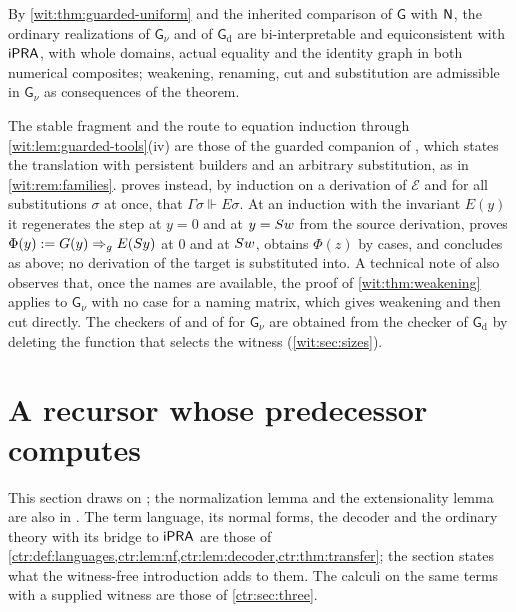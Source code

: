 By \cref{wit:thm:guarded-uniform} and the inherited comparison of
$\mathsf{G}$ with $\mathsf{N}$, the ordinary realizations of $\mathsf{G}_{\nu}$
and of $\mathsf{G}_{\mathrm d}$ are bi-interpretable and equiconsistent with
$\mathsf{iPRA}$, with whole domains, actual equality and the identity graph in both
numerical composites; weakening, renaming, cut and substitution are
admissible in $\mathsf{G}_{\nu}$ as consequences of the theorem.

\begin{remark}[Versions]
\label{wit:rem:guarded-versions}
The stable fragment and the route to equation induction through
\cref{wit:lem:guarded-tools}(iv) are those of the guarded companion of
, which states the translation with persistent
builders and an arbitrary substitution, as in \cref{wit:rem:families}.
 proves instead, by induction on a derivation of
$\mathcal E$ and for all substitutions $\sigma$ at once, that
$\Gamma\sigma\Vdash E\sigma$.  At an induction with the invariant $E(y)$ it
regenerates the step at $y=0$ and at $y=S w$ from the source
derivation, proves $\Phi(y)\mathrel{:=} G(y)\Rightarrow_{g}E(S y)$ at $0$ and
at $S w$, obtains $\Phi(z)$ by cases, and concludes as above; no
derivation of the target is substituted into.  A technical note of
 also observes that, once the names are available, the
proof of \cref{wit:thm:weakening} applies to $\mathsf{G}_{\nu}$ with no
case for a naming matrix, which gives weakening and then cut directly.
The checkers of  and of  for
$\mathsf{G}_{\nu}$ are obtained from the checker of
$\mathsf{G}_{\mathrm d}$ by deleting the function that selects the witness
(\cref{wit:sec:sizes}).
\end{remark}

\section{A recursor whose predecessor computes}
\label{wit:sec:recursor}

This section draws on ; the normalization lemma and the
extensionality lemma are also in .  The term
language, its normal forms, the decoder and the ordinary theory with its
bridge to $\mathsf{iPRA}$ are those of \cref{ctr:def:languages,ctr:lem:nf,ctr:lem:decoder,ctr:thm:transfer};
the section states what the witness-free introduction adds to them.  The
calculi on the same terms with a supplied witness are those of
\cref{ctr:sec:three}.

